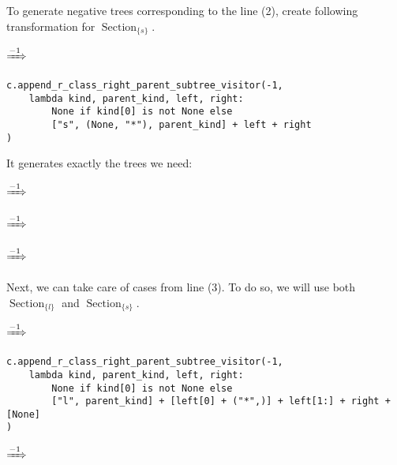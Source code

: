 \documentclass[final]{article}
\theoremstyle{definition}
\theoremstyle{definition}
\theoremstyle{remark}
\DeclareMathOperator{\tSection}{\text{Section}}
\newcommand{\includeinlinescaledsvg}[3]{\begin{minipage}{#1\textwidth}\begin{center}\end{center}\end{minipage}}
\begin{document}
To generate negative trees corresponding to the line (2), create following transformation for \(\tSection_{\{s\}}\).

\begin{center}
    \includeinlinescaledsvg{.4}{.7}{lambda__transformations__003a}%
    \(\xRightarrow{-1}\)%
    \includeinlinescaledsvg{.4}{.7}{lambda__transformations__003b}%
\end{center}

\begin{lstlisting}
c.append_r_class_right_parent_subtree_visitor(-1,
    lambda kind, parent_kind, left, right:
        None if kind[0] is not None else
        ["s", (None, "*"), parent_kind] + left + right
)
\end{lstlisting}

It generates exactly the trees we need:

\begin{center}
    \includeinlinescaledsvg{.24}{.4}{lambda__trees_110__0_base}%
    \(\xRightarrow{-1}\)%
    \includeinlinescaledsvg{.24}{.4}{lambda__trees_110__0}%

    \includeinlinescaledsvg{.24}{.4}{lambda__trees_110__1_base}%
    \(\xRightarrow{-1}\)%
    \includeinlinescaledsvg{.24}{.4}{lambda__trees_110__1}%
    \includeinlinescaledsvg{.24}{.4}{lambda__trees_110__2_base}%
    \(\xRightarrow{-1}\)%
    \includeinlinescaledsvg{.24}{.4}{lambda__trees_110__2}%
\end{center}

Next, we can take care of cases from line (3). To do so, we will use both \(\tSection_{\{l\}}\) and \(\tSection_{\{s\}}\).

\begin{center}
    \includeinlinescaledsvg{.4}{.7}{lambda__transformations__004a}%
    \(\xRightarrow{-1}\)%
    \includeinlinescaledsvg{.4}{.7}{lambda__transformations__004b}%
\end{center}

\begin{lstlisting}
c.append_r_class_right_parent_subtree_visitor(-1,
    lambda kind, parent_kind, left, right:
        None if kind[0] is not None else
        ["l", parent_kind] + [left[0] + ("*",)] + left[1:] + right + [None]
)
\end{lstlisting}

\begin{center}
    \includeinlinescaledsvg{.4}{.7}{lambda__transformations__005a}%
    \(\xRightarrow{-1}\)%
    \includeinlinescaledsvg{.4}{.7}{lambda__transformations__005b}%
\end{center}
\end{document}
